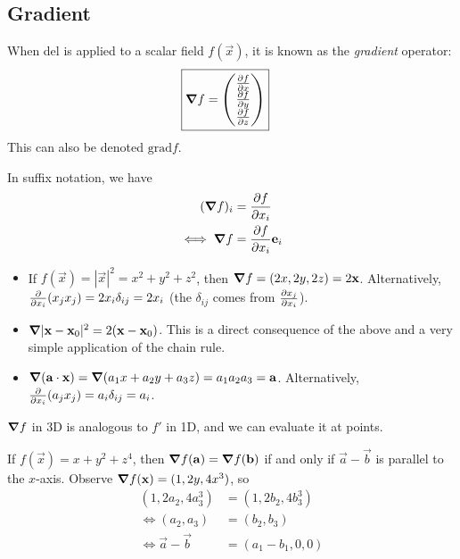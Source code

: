 \documentclass{../template/note}
\begin{document}
    \subsection{Gradient}

    When del is applied to a scalar field \(f(\vec x)\), it is known as the \emph{gradient} operator:
    \begin{align*}
        \Aboxed{\grad f = \begin{pmatrix}
         \pd{f}{x} \\
         \pd{f}{y} \\
         \pd{f}{z} \\
        \end{pmatrix}}
    \end{align*}
    This can also be denoted \(\mathrm{grad} f\).
    
    In suffix notation, we have
    \begin{align*}
        (\grad f)_i &= \pd{f}{x_i} \\
        \iff \grad f &= \pd{f}{x_i} \vec e_i
    \end{align*}
    
    \begin{example*}
        \begin{itemize}
            \item If \(f(\vec x) = |\vec x|^2 = x^2 + y^2 + z^2\), then \(\grad f = (2x, 2y, 2z) = 2\vec x\). Alternatively, \(\pd{}{x_i}(x_jx_j) = 2x_i \delta_{ij} = 2x_i\) (the \(\delta_{ij}\) comes from \(\pd{x_j}{x_i}\)).
            \item \(\grad|\vec x - \vec x_0|^2 = 2(\vec x - \vec x_0)\). This is a direct consequence of the above and a very simple application of the chain rule.
            \item \(\grad(\vec a \cdot \vec x) = \grad(a_1x+a_2y+a_3z) = a_1a_2a_3 = \vec a\). Alternatively, \(\pd{}{x_i}(a_jx_j) = a_i\delta_{ij} = a_i\).
        \end{itemize}
    \end{example*}
    
    \(\grad f\) in 3D is analogous to \(f'\) in 1D, and we can evaluate it at points.

    \begin{example*}
        If \(f(\vec x) = x + y^2 + z^4\), then \(\grad f(\vec a) = \grad f(\vec b)\) if and only if \(\vec a - \vec b\) is parallel to the \(x\)-axis. Observe \(\grad f(\vec x) = (1, 2y, 4x^3)\), so
        \begin{align*}
            (1, 2a_2, 4a_3^3) &= (1, 2b_2, 4b_3^3) \\
            \iff (a_2, a_3) &= (b_2, b_3) \\
            \iff \vec a - \vec b &= (a_1 - b_1, 0, 0)
        \end{align*}
    \end{example*}
    
\end{document}

